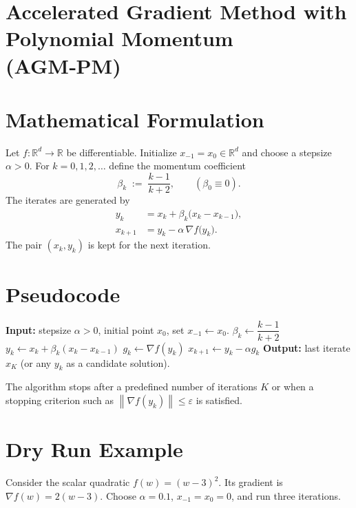 \documentclass{article}
\newcommand{\norm}[1]{\left\lVert #1\right\rVert}
\begin{document}
\section*{Accelerated Gradient Method with Polynomial Momentum (AGM‑PM)}

\section*{Mathematical Formulation}
Let $f:\mathbb{R}^d\rightarrow\mathbb{R}$ be differentiable.  
Initialize $x_{-1}=x_0\in\mathbb{R}^d$ and choose a stepsize $\alpha>0$.  
For $k=0,1,2,\dots$ define the momentum coefficient
\[
\beta_k\;:=\;\frac{k-1}{k+2},\qquad(\beta_0\equiv 0).
\]
The iterates are generated by
\begin{align}
y_k &= x_k+\beta_k\bigl(x_k-x_{k-1}\bigr), \label{eq:y}\\
x_{k+1} &= y_k-\alpha \,\nabla f\!\bigl(y_k\bigr). \label{eq:x}
\end{align}
The pair $(x_k,y_k)$ is kept for the next iteration.  

\section*{Pseudocode}
\begin{algorithm}[H]
\caption{AGM‑PM}
\begin{algorithmic}[1]
\State \textbf{Input:} stepsize $\alpha>0$, initial point $x_0$, set $x_{-1}\gets x_0$.
    \State $\beta_k \gets \dfrac{k-1}{k+2}$ 
    \State $y_k \gets x_k + \beta_k (x_k - x_{k-1})$ \label{alg:y}
    \State $g_k \gets \nabla f(y_k)$ 
    \State $x_{k+1} \gets y_k - \alpha g_k$ \label{alg:x}
\EndFor
\State \textbf{Output:} last iterate $x_{K}$ (or any $y_k$ as a candidate solution).
\end{algorithmic}
\end{algorithm}
The algorithm stops after a predefined number of iterations $K$ or when a stopping criterion such as $\norm{\nabla f(y_k)}\le\varepsilon$ is satisfied.

\section*{Dry Run Example}
Consider the scalar quadratic $f(w)=(w-3)^2$.  
Its gradient is $\nabla f(w)=2(w-3)$.  
Choose $\alpha=0.1$, $x_{-1}=x_0=0$, and run three iterations.
\end{document}
